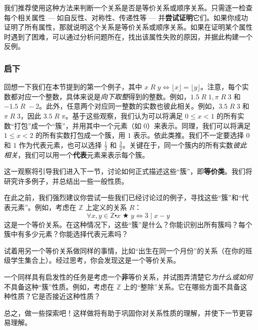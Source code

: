 我们推荐使用这种方法来判断一个关系是否是等价关系或顺序关系。只需逐一检查每个相关属性 --- 如自反性、对称性、传递性等 --- 并\textbf{尝试证明}它们。如果你成功证明了所有属性，那就说明这个关系是等价关系或顺序关系。如果在证明某个属性时遇到了困难，可以通过分析问题所在，找出该属性失败的原因，并据此构建一个反例。

\subsubsection*{启下}

回想一下我们在本节提到的第一个例子，其中 $x \;R\; y \iff \lfloor x \rfloor = \lfloor y \rfloor$。注意，每个实数都对应一个整数，具体来说是\emph{向下取整}得到的整数。例如，$1.5 \;R\; 1, \pi \;R\; 3$ 和 $-1.5 \;R\; -2$。此外，任意两个对应同一整数的实数也彼此相关。例如，$3.5 \;R\; 3$ 和 $\pi \;R\; 3$，因此 $3.5 \;R\; \pi$。基于这些观察，我们认为可以将满足 $0 \le x < 1$ 的所有实数``打包''成一个``簇''，并用其中一个元素（如 $0$）来表示。同理，我们可以将满足 $1 \le x < 2$ 的所有实数打包成一个簇，用 $1$ 表示。依此类推。我们不一定要选择 $0$ 和 $1$ 作为代表元素，也可以选择 $\frac{1}{2}$ 和 $\frac{3}{2}$。关键在于，同一个簇内的所有实数\emph{彼此相关}，我们可以用一个\textbf{代表}元素来表示每个簇。

这一观察将引导我们进入下一节，讨论如何正式描述这些``簇''，即\textbf{等价类}。我们将研究许多例子，并总结出一些一般性质。

在此之前，我们强烈建议你尝试一些我们已经讨论过的例子，寻找这些``簇''和``代表元素''。例如，考虑在 $\mathbb{Z}$ 上定义的关系 $R$：
\[\forall x, y \in \mathbb{Z} \centerdot x \;\bigstar\; y \iff 3 \mid x - y\]
这是一个等价关系。在这种情况下，这些``簇''是什么？你能识别出所有簇吗？每个簇中有多少元素？你能选择代表元素吗？

试着用另一个等价关系做同样的事情，比如``出生在同一个月份''的关系（在你的班级学生集合上）。经过思考，你会发现这是一个等价关系。

一个同样具有启发性的任务是考虑一个\textbf{非}等价关系，并试图弄清楚它\emph{为什么或如何}不具备这种``簇''性质。例如，考虑在 $\mathbb{Z}$ 上的``整除''关系。它在哪些方面不具备这种性质？它是否接近这种性质？

总之，做一些探索吧！这样做将有助于巩固你对关系性质的理解，并使下一节更容易理解。
